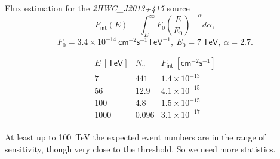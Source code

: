 \begin{frame}{Flux estimation for the \textit{2HWC\_J2013+415} source}
\Large
\vspace{-3ex}
\[
F_\mathsf{int}(E) = \int_{E}^{\infty}F_0\left(\frac{E}{E_0}\right)^{\!\!-\alpha}d\alpha,
\]
\[
F_0 = 3.4\times10^{-14}~\mathsf{cm}^{-2} \mathsf{s}^{-1} \mathsf{TeV}^{-1},~
E_0 = 7~\mathsf{TeV},~
\alpha = 2.7.
\]

\Large
\vspace{-1ex}
\[
\begin{array}{ccc}
E~[\mathsf{TeV}] & N_\gamma & F_\mathsf{int}~[\mathsf{cm}^{-2}\mathsf{s}^{-1}] \\\hline
7 & 441 & 1.4\times10^{-13}\\
56 & 12.9 & 4.1\times10^{-15}\\
100 & 4.8 & 1.5\times10^{-15}\\
1000 & 0.096 & 3.1\times10^{-17}\\
\end{array}
\]

\vspace{0.4ex}
\normalsize
At least up to 100~TeV the expected event numbers are in the range of sensitivity, though very close to the threshold. So we need more statistics.
\end{frame}
